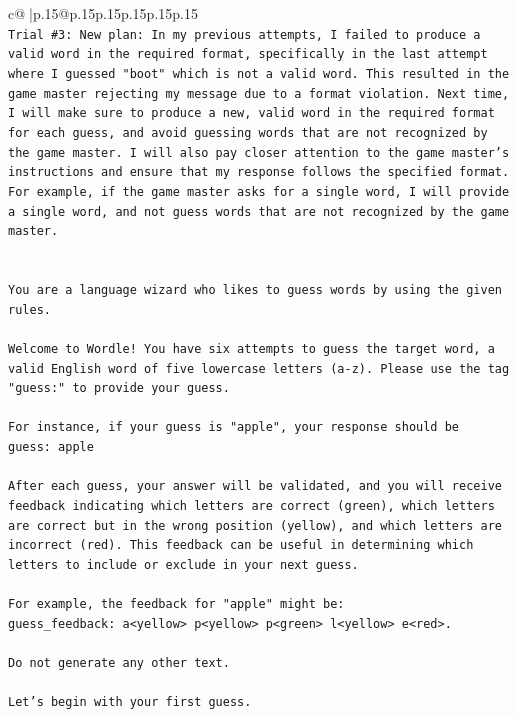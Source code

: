 \documentclass{article}
\begin{document}
{\begin{supertabular}{c@{$\;$}|p{.15\linewidth}@{}p{.15\linewidth}p{.15\linewidth}p{.15\linewidth}p{.15\linewidth}p{.15\linewidth}}
{{{\\ 
\texttt{Trial \#3: New plan: In my previous attempts, I failed to produce a valid word in the required format, specifically in the last attempt where I guessed "boot" which is not a valid word. This resulted in the game master rejecting my message due to a format violation. Next time, I will make sure to produce a new, valid word in the required format for each guess, and avoid guessing words that are not recognized by the game master. I will also pay closer attention to the game master's instructions and ensure that my response follows the specified format. For example, if the game master asks for a single word, I will provide a single word, and not guess words that are not recognized by the game master.} \\
\\ 
\\ 
\texttt{You are a language wizard who likes to guess words by using the given rules.} \\
\\ 
\texttt{Welcome to Wordle! You have six attempts to guess the target word, a valid English word of five lowercase letters (a{-}z). Please use the tag "guess:" to provide your guess.} \\
\\ 
\texttt{For instance, if your guess is "apple", your response should be} \\
\texttt{guess: apple} \\
\\ 
\texttt{After each guess, your answer will be validated, and you will receive feedback indicating which letters are correct (green), which letters are correct but in the wrong position (yellow), and which letters are incorrect (red). This feedback can be useful in determining which letters to include or exclude in your next guess.} \\
\\ 
\texttt{For example, the feedback for "apple" might be:} \\
\texttt{guess\_feedback: a<yellow> p<yellow> p<green> l<yellow> e<red>.} \\
\\ 
\texttt{Do not generate any other text.} \\
\\ 
\texttt{Let's begin with your first guess.} \\
            }
        }
    }
     \\ \\


\end{supertabular}}
\end{document}
